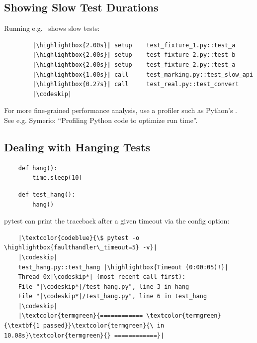 \subsection{Showing Slow Test Durations}
Running e.g.\  shows slow tests:

\begin{verbatim}
        |\highlightbox{2.00s}| setup    test_fixture_1.py::test_a
        |\highlightbox{2.00s}| setup    test_fixture_2.py::test_b
        |\highlightbox{2.00s}| setup    test_fixture_2.py::test_a
        |\highlightbox{1.00s}| call     test_marking.py::test_slow_api
        |\highlightbox{0.27s}| call     test_real.py::test_convert
        |\codeskip|
    \end{verbatim}

\hspace{1em}
\begin{minipage}{.8\linewidth}
    For more fine-grained performance analysis, use a profiler such as Python's . \\
    See e.g. Symerio: \enquote{Profiling Python code to optimize run time}.
\end{minipage}

\subsection{Dealing with Hanging Tests}
\vspace{1em}

\begin{minipage}{.45\linewidth}
    \begin{verbatim}
    def hang():
        time.sleep(10)
\end{verbatim}
\end{minipage}
\begin{minipage}{.45\linewidth}
    \begin{verbatim}
    def test_hang():
        hang()
\end{verbatim}
\end{minipage}
\vspace{1em}

pytest can print the traceback after a given timeout via the  config option:
\pagebreak

\begin{verbatim}
    |\textcolor{codeblue}{\$ pytest -o \highlightbox{faulthandler\_timeout=5} -v}|
    |\codeskip|
    test_hang.py::test_hang |\highlightbox{Timeout (0:00:05)!}|
    Thread 0x|\codeskip*| (most recent call first):
    File "|\codeskip*|/test_hang.py", line 3 in hang
    File "|\codeskip*|/test_hang.py", line 6 in test_hang
    |\codeskip|
    |\textcolor{termgreen}{============ \textcolor{termgreen}{\textbf{1 passed}}\textcolor{termgreen}{\ in 10.08s}\textcolor{termgreen}{} ============}|
\end{verbatim}

